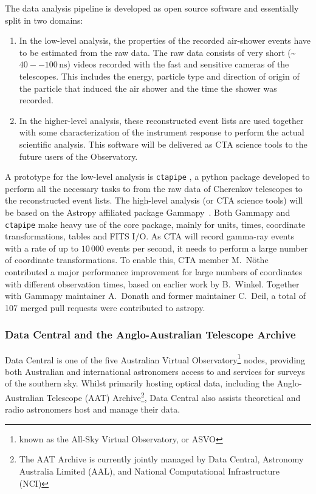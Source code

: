 \documentclass[modern]{aastex631}
\newcommand{\secauthor}[1]{{\color{blue}Author:~\textit{#1}}}
\begin{document}
The data analysis pipeline is developed as open source software and essentially split in two domains:
\begin{enumerate}
  \item In the low-level analysis, the properties of the recorded air-shower events
    have to be estimated from the raw data.
    The raw data consists of very short (\textasciitilde $40--100\,\mathrm{ns}$) videos recorded with the fast and
    sensitive cameras of the telescopes.
    This includes the energy, particle type and direction of origin of the particle that induced the air shower
    and the time the shower was recorded.
  \item In the higher-level analysis, these reconstructed event lists are used together with some
    characterization of the instrument response to perform the actual scientific analysis.
    This software will be delivered as CTA science tools to the future users of the Observatory.
\end{enumerate}

A prototype for the low-level analysis is \texttt{ctapipe} \citep{ctapipe},
a python package developed to perform all the necessary tasks to from the raw data
of Cherenkov telescopes to the reconstructed event lists.
The high-level analysis (or CTA science tools) will be based on the Astropy affiliated package
Gammapy~\citep{gammapy}.
Both Gammapy and \texttt{ctapipe} make heavy use of the \astropy core package, mainly for units, times, coordinate transformations,
tables and FITS I/O.
As CTA will record gamma-ray events with a rate of up to $10\,000$ events per second,
it needs to perform a large number of coordinate transformations.
To enable this, CTA member M.~Nöthe contributed a major performance improvement
for large numbers of coordinates with different observation times,
based on earlier work by B.~Winkel.
Together with Gammapy maintainer A.~Donath and former maintainer C.~Deil,
a total of 107 merged pull requests were contributed to astropy.

\subsubsection{Data Central and the Anglo-Australian Telescope Archive}
Data Central is one of the five Australian Virtual Observatory\footnote{known as
  the All-Sky Virtual Observatory, or ASVO} nodes, providing both Australian and
international astronomers access to and services for surveys of the southern
sky. Whilst primarily hosting optical data, including the Anglo-Australian
Telescope (AAT) Archive\footnote{The AAT Archive is currently jointly managed by
  Data Central, Astronomy Australia Limited (AAL), and National Computational
  Infrastructure (NCI)}, Data Central also assists theoretical and radio
astronomers host and manage their data.
\end{document}

